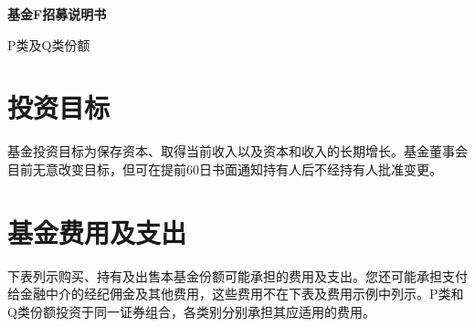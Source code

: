 \documentclass[UTF8,fontset=none,11pt,a4paper]{ctexart}
\begin{document}
{\noindent\fontsize{20}{25}\selectfont\bfseries 基金F招募说明书\par}
\vspace{10pt}
P类及Q类份额




\section*{投资目标}
基金投资目标为保存资本、取得当前收入以及资本和收入的长期增长。基金董事会目前无意改变目标，但可在提前60日书面通知持有人后不经持有人\allowbreak\mbox{批准变更。}


\section*{基金费用及支出}
下表列示购买、持有及出售本基金份额可能承担的费用及支出。您还可能承担支付给金融中介的经纪佣金及其他费用，这些费用不在下表及费用示例中列示。P类和Q类份额投资于同一证券组合，各类别分别承担其应适\allowbreak\mbox{用的费用。}
\end{document}
